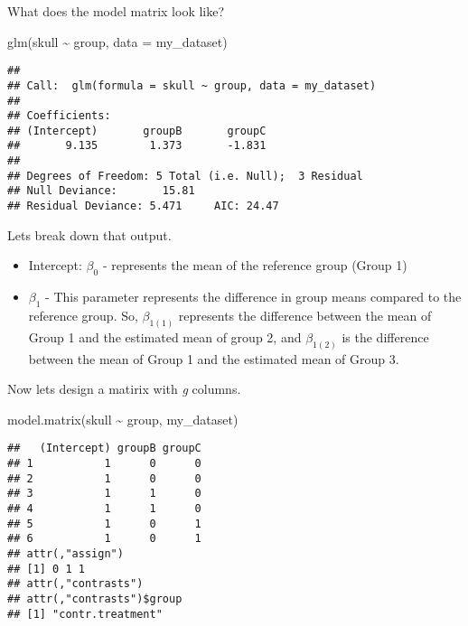 \documentclass[
]{article}
\newenvironment{Shaded}{\begin{snugshade}}{\end{snugshade}}
\newcommand{\AttributeTok}[1]{\textcolor[rgb]{0.77,0.63,0.00}{#1}}
\newcommand{\FunctionTok}[1]{\textcolor[rgb]{0.00,0.00,0.00}{#1}}
\newcommand{\NormalTok}[1]{#1}
\newcommand{\SpecialCharTok}[1]{\textcolor[rgb]{0.00,0.00,0.00}{#1}}
\providecommand{\tightlist}{%
  \setlength{\itemsep}{0pt}\setlength{\parskip}{0pt}}
\begin{document}
What does the model matrix look like?

\begin{Shaded}
\begin{Highlighting}[]
\FunctionTok{glm}\NormalTok{(skull }\SpecialCharTok{\textasciitilde{}}\NormalTok{ group, }\AttributeTok{data =}\NormalTok{ my\_dataset)}
\end{Highlighting}
\end{Shaded}

\begin{verbatim}
## 
## Call:  glm(formula = skull ~ group, data = my_dataset)
## 
## Coefficients:
## (Intercept)       groupB       groupC  
##       9.135        1.373       -1.831  
## 
## Degrees of Freedom: 5 Total (i.e. Null);  3 Residual
## Null Deviance:       15.81 
## Residual Deviance: 5.471     AIC: 24.47
\end{verbatim}

Lets break down that output.

\begin{itemize}
\tightlist
\item
  Intercept: \(\beta_0\) - represents the mean of the reference group
  (Group 1)
\item
  \(\beta_1\) - This parameter represents the difference in group means
  compared to the reference group. So, \(\beta_{1(1)}\) represents the
  difference between the mean of Group 1 and the estimated mean of group
  2, and \(\beta_{1(2)}\) is the difference between the mean of Group 1
  and the estimated mean of Group 3.
\end{itemize}

Now lets design a matirix with \emph{g} columns.

\begin{Shaded}
\begin{Highlighting}[]
\FunctionTok{model.matrix}\NormalTok{(skull }\SpecialCharTok{\textasciitilde{}}\NormalTok{ group, my\_dataset)}
\end{Highlighting}
\end{Shaded}

\begin{verbatim}
##   (Intercept) groupB groupC
## 1           1      0      0
## 2           1      0      0
## 3           1      1      0
## 4           1      1      0
## 5           1      0      1
## 6           1      0      1
## attr(,"assign")
## [1] 0 1 1
## attr(,"contrasts")
## attr(,"contrasts")$group
## [1] "contr.treatment"
\end{verbatim}
\end{document}
